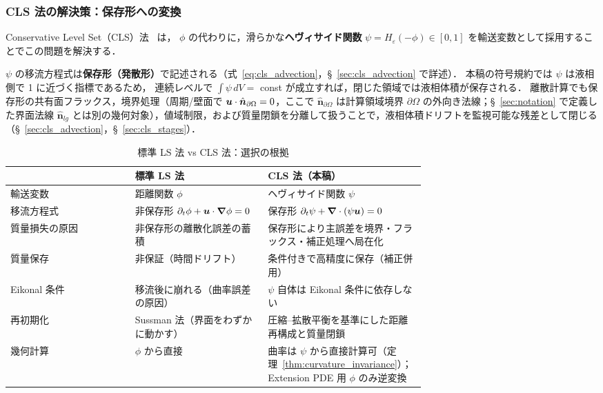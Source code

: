 \subsubsection{CLS 法の解決策：保存形への変換}

Conservative Level Set（CLS）法~\cite{OlssonKreiss2005} は，
$\phi$ の代わりに，滑らかな\textbf{ヘヴィサイド関数} $\psi = H_\varepsilon(-\phi) \in [0,1]$
を輸送変数として採用することでこの問題を解決する．

$\psi$ の移流方程式は\textbf{保存形（発散形）}で記述される（式~\eqref{eq:cls_advection}，§~\ref{sec:cls_advection} で詳述）．
本稿の符号規約では $\psi$ は液相側で 1 に近づく指標であるため，
連続レベルで $\int\psi\,dV =$ const が成立すれば，閉じた領域では液相体積が保存される．
離散計算でも保存形の共有面フラックス，境界処理（周期/壁面で $\bm{u}\cdot\hat{\bm n}_{\partial\Omega}=0$，ここで $\hat{\bm n}_{\partial\Omega}$ は計算領域境界 $\partial\Omega$ の外向き法線；§~\ref{sec:notation} で定義した界面法線 $\hat{\bm n}_{lg}$ とは別の幾何対象），値域制限，および質量閉鎖を分離して扱うことで，液相体積ドリフトを監視可能な残差として閉じる（§~\ref{sec:cls_advection}，§~\ref{sec:cls_stages}）．

\begin{table}[htbp]
\caption{標準 LS 法 vs CLS 法：選択の根拠}
\begin{center}
\PaperTableDenseSetup
\begin{tabular}{lp{0.32\linewidth}p{0.38\linewidth}}
\hline
 & \textbf{標準 LS 法} & \textbf{CLS 法（本稿）} \\
\hline
輸送変数 & 距離関数 $\phi$ & ヘヴィサイド関数 $\psi$ \\
移流方程式 & 非保存形 $\partial_t\phi + \bm{u}\cdot\bm{\nabla}\phi=0$ & 保存形 $\partial_t\psi+\bm{\nabla}\cdot(\psi\bm{u})=0$ \\
質量損失の原因 & 非保存形の離散化誤差の蓄積 & 保存形により主誤差を境界・フラックス・補正処理へ局在化 \\
質量保存 & 非保証（時間ドリフト） & 条件付きで高精度に保存（補正併用） \\
Eikonal 条件 & 移流後に崩れる（曲率誤差の原因） & $\psi$ 自体は Eikonal 条件に依存しない \\
再初期化 & Sussman 法（界面をわずかに動かす） & 圧縮--拡散平衡を基準にした距離再構成と質量閉鎖 \\
幾何計算 & $\phi$ から直接 & 曲率は $\psi$ から直接計算可（定理~\ref{thm:curvature_invariance}）；Extension PDE 用 $\phi$ のみ逆変換 \\
\hline
\end{tabular}
\end{center}
\end{table}
